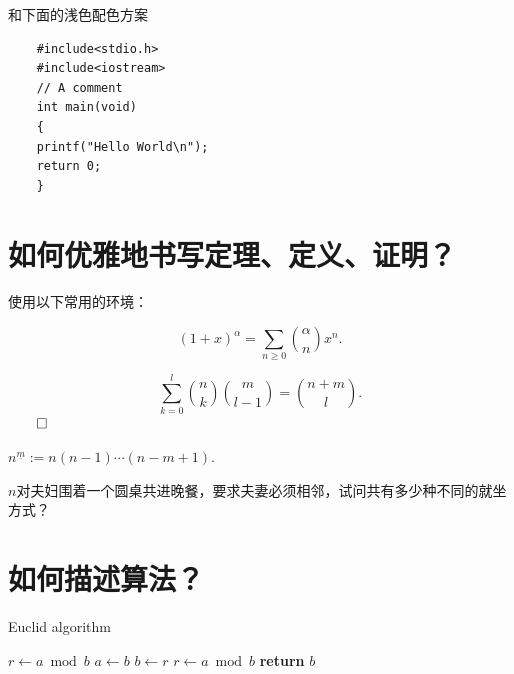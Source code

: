 \documentclass[twoside]{ctexart}
\newcounter{counter_exm}\setcounter{counter_exm}{1}
\newtheorem{theorem}{\hskip 1.7em 定理}
\newtheorem{definition}[theorem]{\hskip 1.7em 定义}
\renewenvironment{proof}{{\noindent\hskip 2em \bf 证明 \quad}}{\hfill$\qed$\par}
\newenvironment{example}{{\noindent\hskip 2em \bf 例 \arabic{counter_exm}\quad}}{\addtocounter{counter_exm}{1}\par}
\begin{document}
和下面的浅色配色方案
\begin{frame}

\begin{lstlisting}
    #include<stdio.h>
    #include<iostream>
    // A comment
    int main(void)
    {
    printf("Hello World\n");
    return 0;
    }
\end{lstlisting}

\end{frame}
    
    \section{如何优雅地书写定理、定义、证明？}
    
    使用以下常用的环境：
    
    \begin{theorem}
    	\[
            (1+x)^\alpha=\sum_{n\geq 0}{\binom{\alpha}{n}}x^n.
        \]
    \end{theorem}

	\begin{proof}
	    $$
            \sum_{k=0}^{l} \binom{n}{k} \binom{m}{l-1} = { \binom{n+m}{l} }.
        $$
	\end{proof}
	
	\begin{definition}
		$n^{\underline{m}}:=n(n-1)\cdots (n-m+1)$.
	\end{definition}

	\begin{example}
		$n$对夫妇围着一个圆桌共进晚餐，要求夫妻必须相邻，试问共有多少种不同的就坐方式？
	\end{example}
	
	\section{如何描述算法？}

    \begin{algorithm}
    \caption{Euclid algorithm}
    \label{alg:euclid}
    \begin{algorithmic}[1]
        \State $r\gets a\bmod b$
        \State $a\gets b$
        \State $b\gets r$
        \State $r\gets a\bmod b$
        \EndWhile\label{euclidendwhile}
       \State \textbf{return} $b$
       \EndProcedure
   \end{algorithmic}
   \end{algorithm}
    
\end{document}
